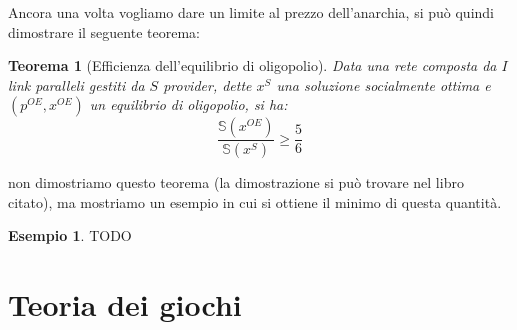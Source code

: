\documentclass[a4paper]{article}
\newcounter{counter1}
\theoremstyle{plain}
\newtheorem{myteo}[counter1]{Teorema}
\theoremstyle{definition}
\newtheorem{myes}[counter1]{Esempio}
\theoremstyle{remark}
\newcommand{\pa}[1]{\left(#1\right)}
\begin{document}
Ancora una volta vogliamo dare un limite al prezzo dell'anarchia, si
può quindi dimostrare il seguente teorema:

\begin{myteo}[Efficienza dell'equilibrio di
  oligopolio{\cite[Teorema 3.14]{menache2011network}}]
  Data una rete composta da $I$ link paralleli gestiti da $S$
  provider, dette $x^{S}$ una soluzione socialmente ottima e
  $\pa{p^{OE},x^{OE}}$ un equilibrio di oligopolio, si ha:
  \[ \frac{\mathbb{S}\pa{x^{OE}}} {\mathbb{S}\pa{x^S}} \ge
    \frac{5}{6} \]
\end{myteo}
non dimostriamo questo teorema (la dimostrazione si può trovare nel
libro citato), ma mostriamo un esempio in cui si ottiene il minimo di
questa quantità.

\begin{myes}
  TODO
\end{myes}


\appendix

\section{Teoria dei giochi}
\label{sec:teoria-giochi}

\cite{menache2011network}




\end{document}
